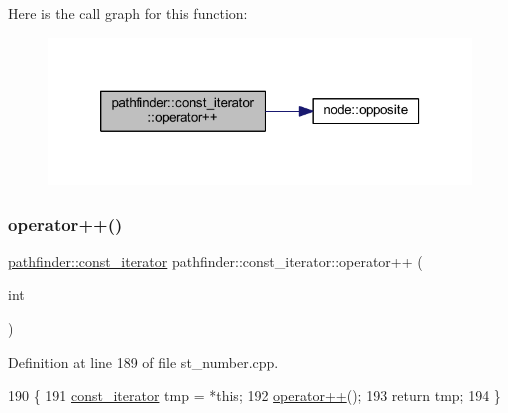 Here is the call graph for this function\+:\nopagebreak
\begin{figure}[H]
\begin{center}
\leavevmode
\includegraphics[width=320pt]{classpathfinder_1_1const__iterator_acc71bfba7f3318446d97cf058871b015_cgraph}
\end{center}
\end{figure}
\mbox{\label{classpathfinder_1_1const__iterator_a1ed8257e9acb6d55cfc49753a134ac9f}} 
\subsubsection{\texorpdfstring{operator++()}{operator++()}\hspace{0.1cm}{\footnotesize\ttfamily [2/2]}}
{\footnotesize\ttfamily \mbox{\hyperlink{classpathfinder_1_1const__iterator}{pathfinder\+::const\+\_\+iterator}} pathfinder\+::const\+\_\+iterator\+::operator++ (\begin{DoxyParamCaption}\item[{int}]{ }\end{DoxyParamCaption})}



Definition at line 189 of file st\+\_\+number.\+cpp.


\begin{DoxyCode}
190 \{
191     \mbox{\hyperlink{classpathfinder_1_1const__iterator_a8766a7016c300cbbe9c5f8fa61ec44d1}{const\_iterator}} tmp = *\textcolor{keyword}{this};
192     \mbox{\hyperlink{classpathfinder_1_1const__iterator_acc71bfba7f3318446d97cf058871b015}{operator++}}();
193     \textcolor{keywordflow}{return} tmp;
194 \}
\end{DoxyCode}
\mbox{\label{classpathfinder_1_1const__iterator_aa4ed66f83b966672c7beb112d1266459}} 
